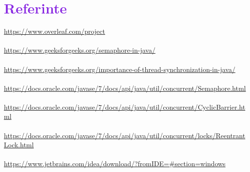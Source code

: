 \documentclass{article}
\begin{document}
\section{\textcolor{BlueViolet}{Referinte}}\label{sec_ed}
\url{https://www.overleaf.com/project}\\\\
\url{https://www.geeksforgeeks.org/semaphore-in-java/}\\\\
\url{https://www.geeksforgeeks.org/importance-of-thread-synchronization-in-java/}\\\\
\url{https://docs.oracle.com/javase/7/docs/api/java/util/concurrent/Semaphore.html}\\\\
\url{https://docs.oracle.com/javase/7/docs/api/java/util/concurrent/CyclicBarrier.html}\\\\
\url{https://docs.oracle.com/javase/7/docs/api/java/util/concurrent/locks/ReentrantLock.html}\\\\
\url{https://www.jetbrains.com/idea/download/?fromIDE=#section=windows}\\\\
\end{document}
